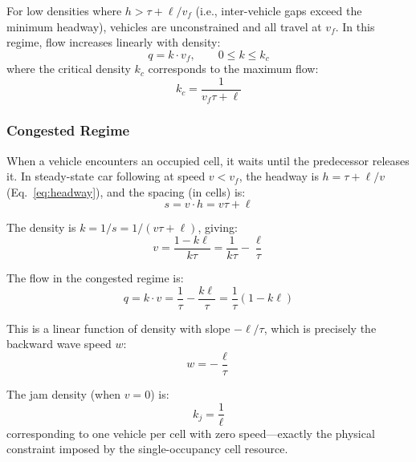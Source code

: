 \documentclass[review,authoryear]{elsarticle}
\begin{document}
For low densities where $h > \tau + \ell / v_f$ (i.e., inter-vehicle gaps exceed the minimum headway), vehicles are unconstrained and all travel at $v_f$. In this regime, flow increases linearly with density:
\begin{equation}
    q = k \cdot v_f, \qquad 0 \leq k \leq k_c
    \label{eq:fd_freeflow}
\end{equation}
where the critical density $k_c$ corresponds to the maximum flow:
\begin{equation}
    k_c = \frac{1}{v_f \tau + \ell}
    \label{eq:critical_density}
\end{equation}

\subsubsection{Congested Regime}

When a vehicle encounters an occupied cell, it waits until the predecessor releases it. In steady-state car following at speed $v < v_f$, the headway is $h = \tau + \ell / v$ (Eq.~\ref{eq:headway}), and the spacing (in cells) is:
\begin{equation}
    s = v \cdot h = v\tau + \ell
    \label{eq:spacing_congested}
\end{equation}

The density is $k = 1/s = 1/(v\tau + \ell)$, giving:
\begin{equation}
    v = \frac{1 - k\ell}{k\tau} = \frac{1}{k\tau} - \frac{\ell}{\tau}
    \label{eq:speed_density_congested}
\end{equation}

The flow in the congested regime is:
\begin{equation}
    q = k \cdot v = \frac{1}{\tau} - \frac{k\ell}{\tau} = \frac{1}{\tau}\left(1 - k\ell\right)
    \label{eq:flow_congested}
\end{equation}

This is a linear function of density with slope $-\ell/\tau$, which is precisely the backward wave speed $w$:
\begin{equation}
    w = -\frac{\ell}{\tau}
    \label{eq:wave_speed}
\end{equation}

The jam density (when $v = 0$) is:
\begin{equation}
    k_j = \frac{1}{\ell}
    \label{eq:jam_density}
\end{equation}
corresponding to one vehicle per cell with zero speed---exactly the physical constraint imposed by the single-occupancy cell resource.
\end{document}
